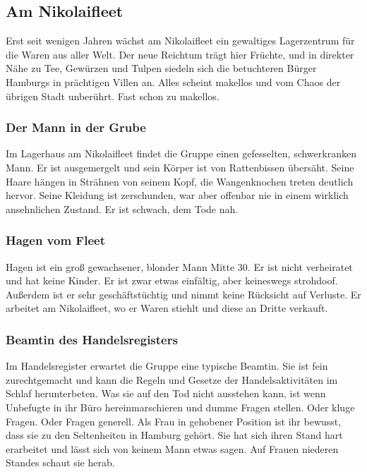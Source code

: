 \subsection{Am Nikolaifleet}

Erst seit wenigen Jahren wächst am Nikolaifleet ein gewaltiges Lagerzentrum für die Waren aus aller Welt. Der neue Reichtum trägt hier Früchte, und in direkter Nähe zu Tee, Gewürzen und Tulpen siedeln sich die betuchteren Bürger Hamburgs in prächtigen Villen an. Alles scheint makellos und vom Chaos der übrigen Stadt unberührt. Fast schon zu makellos.

\subsubsection*{Der Mann in der Grube}
\label{Grubenmann}

Im Lagerhaus am Nikolaifleet findet die Gruppe einen gefesselten, schwerkranken Mann. Er ist ausgemergelt und sein Körper ist von Rattenbissen übersäht. Seine Haare hängen in Strähnen von seinem Kopf, die Wangenknochen treten deutlich hervor. Seine Kleidung ist zerschunden, war aber offenbar nie in einem wirklich ansehnlichen Zustand. Er ist schwach, dem Tode nah.

\subsubsection*{Hagen vom Fleet}
\label{Hagen}

Hagen ist ein groß gewachsener, blonder Mann Mitte 30. Er ist nicht verheiratet und hat keine Kinder. Er ist zwar etwas einfältig, aber keineswegs strohdoof. Außerdem ist er sehr geschäftstüchtig und nimmt keine Rücksicht auf Verluste. Er arbeitet am Nikolaifleet, wo er Waren stiehlt und diese an Dritte verkauft.

\subsubsection*{Beamtin des Handelsregisters}
\label{Beamtin}

Im Handelsregister erwartet die Gruppe eine typische Beamtin. Sie ist fein zurechtgemacht und kann die Regeln und Gesetze der Handelsaktivitäten im Schlaf herunterbeten. Was sie auf den Tod nicht ausstehen kann, ist wenn Unbefugte in ihr Büro hereinmarschieren und dumme Fragen stellen. Oder kluge Fragen. Oder Fragen generell. Als Frau in gehobener Position ist ihr bewusst, dass sie zu den Seltenheiten in Hamburg gehört. Sie hat sich ihren Stand hart erarbeitet und lässt sich von keinem Mann etwas sagen. Auf Frauen niederen Standes schaut sie herab.


